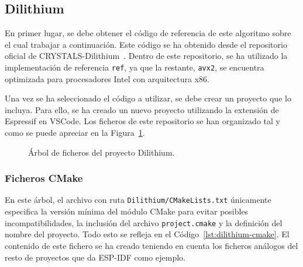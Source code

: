 

\subsection{Dilithium}\label{subsec:dilithium}

En primer lugar, se debe obtener el código de referencia de este algoritmo sobre el cual trabajar a continuación.
Este código se ha obtenido desde el repositorio oficial de CRYSTALS-Dilithium~\cite{github-dilithium}.
Dentro de este repositorio, se ha utilizado la implementación de referencia \texttt{ref}, ya que la restante, \texttt{avx2}, se encuentra optimizada para procesadores Intel con arquitectura x86.

Una vez se ha seleccionado el código a utilizar, se debe crear un proyecto que lo incluya.
Para ello, se ha creado un nuevo proyecto utilizando la extensión de Espressif en VSCode.
Los ficheros de este repositorio se han organizado tal y como se puede apreciar en la Figura~\ref{tree:dilithium}.

\begin{figure}[H]
\centering
{}
\caption{Árbol de ficheros del proyecto Dilithium.}
\label{tree:dilithium}
\end{figure}

\subsubsection{Ficheros CMake}\label{subsubsec:dilithium-cmake}

En este árbol, el archivo con ruta \texttt{Dilithium/CMakeLists.txt} únicamente especifica la versión mínima del módulo CMake para evitar posibles incompatibilidades, la inclusión del archivo \texttt{project.cmake} y la definición del nombre del proyecto.
Todo esto se refleja en el Código~\ref{lst:dilithium-cmake}.
El contenido de este fichero se ha creado teniendo en cuenta los ficheros análogos del resto de proyectos que da ESP-IDF como ejemplo.

